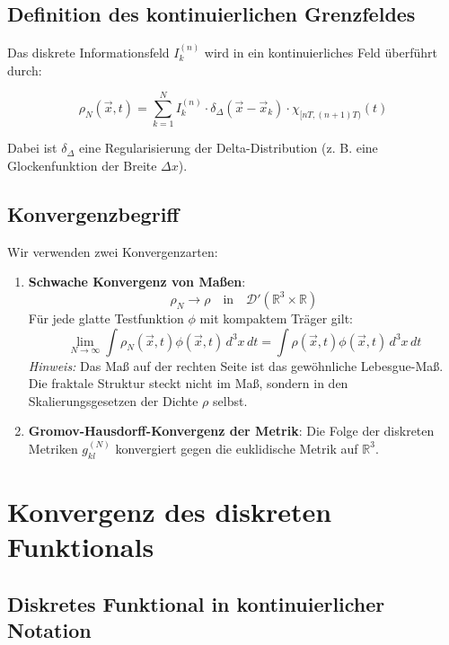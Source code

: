 \subsection{Definition des kontinuierlichen Grenzfeldes}
\label{sub:kontinuumslimes_grenzfeld}

Das diskrete Informationsfeld \( I_k^{(n)} \) wird in ein kontinuierliches Feld überführt durch:

\[
\rho_N(\vec{x}, t) = \sum_{k=1}^N I_k^{(n)} \cdot \delta_\Delta(\vec{x} - \vec{x}_k) \cdot \chi_{[nT, (n+1)T)}(t)
\]

Dabei ist \( \delta_\Delta \) eine Regularisierung der Delta-Distribution (z. B. eine Glockenfunktion der Breite \( \Delta x \)).

\subsection{Konvergenzbegriff}
\label{sub:kontinuumslimes_konvergenz}

Wir verwenden zwei Konvergenzarten:

\begin{enumerate}
    \item \textbf{Schwache Konvergenz von Maßen}:
          \[
          \rho_N \to \rho \quad \text{in} \quad \mathcal{D}'(\mathbb{R}^3 \times \mathbb{R})
          \]
          Für jede glatte Testfunktion \( \phi \) mit kompaktem Träger gilt:
          \[
          \lim_{N \to \infty} \int \rho_N(\vec{x}, t) \phi(\vec{x}, t) \, d^3x \, dt =
          \int \rho(\vec{x}, t) \phi(\vec{x}, t) \, d^3x \, dt
          \]
          \emph{Hinweis:} Das Maß auf der rechten Seite ist das gewöhnliche Lebesgue-Maß. Die fraktale Struktur steckt nicht im Maß, sondern in den Skalierungsgesetzen der Dichte \( \rho \) selbst.

    \item \textbf{Gromov-Hausdorff-Konvergenz der Metrik}:
          Die Folge der diskreten Metriken \( g_{kl}^{(N)} \) konvergiert gegen die euklidische Metrik auf \( \mathbb{R}^3 \).
\end{enumerate}

\section{Konvergenz des diskreten Funktionals}
\label{app:kontinuumslimes_funktional_konvergenz}

\subsection{Diskretes Funktional in kontinuierlicher Notation}
\label{sub:kontinuumslimes_funktional_diskret}

